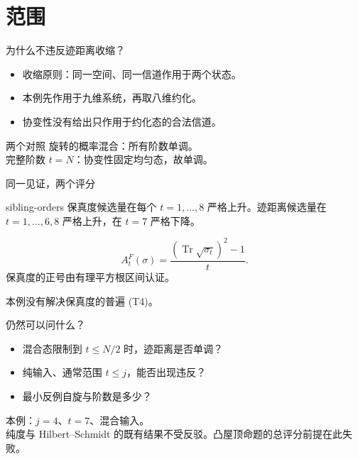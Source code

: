 \documentclass{beamer}
\begin{document}
\section{范围}
\begin{frame}{为什么不违反迹距离收缩？}
\begin{itemize}
\item 收缩原则：同一空间、同一信道作用于两个状态。
\item 本例先作用于九维系统，再取八维约化。
\item 协变性没有给出只作用于约化态的合法信道。
\end{itemize}
\begin{block}{两个对照}
旋转的概率混合：所有阶数单调。\\
完整阶数 $t=N$：协变性固定均匀态，故单调。
\end{block}
\end{frame}
\begin{frame}{同一见证，两个评分}
\begin{bookresult}{sibling-orders}
保真度候选量在每个 $t=1,\ldots,8$ 严格上升。迹距离候选量在 $t=1,\ldots,6,8$ 严格上升，在 $t=7$ 严格下降。
\end{bookresult}
\[A_t^F(\sigma)=\frac{(\operatorname{Tr}\sqrt{\sigma_t})^2-1}{t}.\]
\small 保真度的正号由有理平方根区间认证。

本例没有解决保真度的普遍 (T4)。
\end{frame}
\begin{frame}{仍然可以问什么？}
\begin{itemize}
\item 混合态限制到 $t\leq N/2$ 时，迹距离是否单调？
\item 纯输入、通常范围 $t\leq j$，能否出现违反？
\item 最小反例自旋与阶数是多少？
\end{itemize}
\medskip
本例：$j=4$、$t=7$、混合输入。\\
\small 纯度与 Hilbert--Schmidt 的既有结果不受反驳。凸屋顶命题的总评分前提在此失败。
\end{frame}
\appendix
\end{document}
